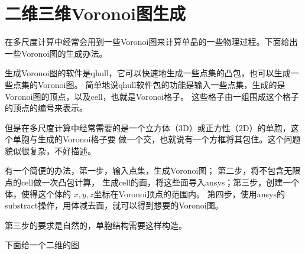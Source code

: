 
\section{二维三维Voronoi图生成}

在多尺度计算中经常会用到一些Voronoi图来计算单晶的一些物理过程。下面给出一些Voronoi图的生成办法。

生成Voronoi图的软件是qhull，它可以快速地生成一些点集的凸包，也可以生成一些点集的Voronoi图。
简单地说qhull软件包的功能是输入一些点集，生成的是Voronoi图的顶点，以及cell，也就是Voronoi格子。
这些格子由一组围成这个格子的顶点的编号来表示。

但是在多尺度计算中经常需要的是一个立方体（3D）或正方性（2D）的单胞，这个单胞与生成的Voronoi格子要
做一个交，也就说有一个方框将其包住。这个问题貌似很复杂，不好描述。

有一个简便的办法，第一步，输入点集，生成Voronoi图； 第二步，将不包含无限点的cell做一次凸包计算，
生成cell的面，将这些面导入ansys；第三步，创建一个体，使得这个体的 $x,y,z$坐标在Voronoi顶点的范围内。
第四步，使用ansys的substract操作，用体减去面，就可以得到想要的Voronoi图。

\begin{remark}
	第三步的要求是自然的，单胞结构需要这样构造。
\end{remark}
下面给一个二维的图

\begin{figure}[htbp]
	\begin{center}
\end{center}
	\label{fig:123}
\end{figure}


